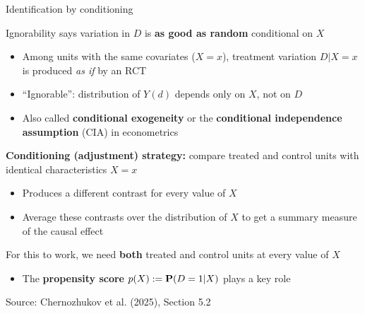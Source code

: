 \documentclass[compress, 8pt]{beamer}
\begin{document}
\begin{frame}{Identification by conditioning}

Ignorability says variation in $D$ is \textbf{as good as random} conditional on $X$
\begin{itemize}
    \item Among units with the same covariates ($X = x$), treatment variation $D \vert X = x$ is produced \emph{as if} by an RCT
    \item ``Ignorable'': distribution of $Y(d)$ depends only on $X$, not on $D$
    \item Also called \textbf{conditional exogeneity} or the \textbf{conditional independence assumption} (CIA) in econometrics
\end{itemize}

\pause
\vspace{2ex}
\textbf{Conditioning (adjustment) strategy:} compare treated and control units with identical characteristics $X = x$
\begin{itemize}
    \item Produces a different contrast for every value of $X$
    \item Average these contrasts over the distribution of $X$ to get a summary measure of the causal effect
\end{itemize}

\pause
\vspace{2ex}
For this to work, we need \textbf{both} treated and control units at every value of $X$
\begin{itemize}
    \item The \textbf{propensity score} $p(X) := \mathbf{P}(D = 1 \vert X)$ plays a key role
\end{itemize}

\vspace{2ex}
{\footnotesize Source: Chernozhukov et al. (2025), Section 5.2}
\end{frame}
\end{document}
